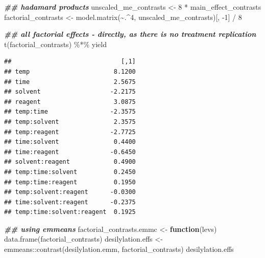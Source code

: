 \documentclass[
]{book}
\newenvironment{Shaded}{\begin{snugshade}}{\end{snugshade}}
\newcommand{\ControlFlowTok}[1]{\textcolor[rgb]{0.13,0.29,0.53}{\textbf{#1}}}
\newcommand{\DecValTok}[1]{\textcolor[rgb]{0.00,0.00,0.81}{#1}}
\newcommand{\DocumentationTok}[1]{\textcolor[rgb]{0.56,0.35,0.01}{\textbf{\textit{#1}}}}
\newcommand{\FunctionTok}[1]{\textcolor[rgb]{0.00,0.00,0.00}{#1}}
\newcommand{\NormalTok}[1]{#1}
\newcommand{\OtherTok}[1]{\textcolor[rgb]{0.56,0.35,0.01}{#1}}
\newcommand{\SpecialCharTok}[1]{\textcolor[rgb]{0.00,0.00,0.00}{#1}}
\newcommand{\StringTok}[1]{\textcolor[rgb]{0.31,0.60,0.02}{#1}}
\theoremstyle{definition}
\theoremstyle{definition}
\theoremstyle{definition}
\theoremstyle{definition}
\theoremstyle{remark}
\begin{document}
\begin{Shaded}
\begin{Highlighting}[]
\DocumentationTok{\#\# hadamard products}
\NormalTok{unscaled\_me\_contrasts }\OtherTok{\textless{}{-}} \DecValTok{8} \SpecialCharTok{*}\NormalTok{ main\_effect\_contrasts}
\NormalTok{factorial\_contrasts }\OtherTok{\textless{}{-}} \FunctionTok{model.matrix}\NormalTok{(}\SpecialCharTok{\textasciitilde{}}\NormalTok{.}\SpecialCharTok{\^{}}\DecValTok{4}\NormalTok{, unscaled\_me\_contrasts)[, }\SpecialCharTok{{-}}\DecValTok{1}\NormalTok{] }\SpecialCharTok{/} \DecValTok{8}

\DocumentationTok{\#\# all factorial effects {-} directly, as there is no treatment replication}
\FunctionTok{t}\NormalTok{(factorial\_contrasts) }\SpecialCharTok{\%*\%}\NormalTok{ yield}
\end{Highlighting}
\end{Shaded}

\begin{verbatim}
##                              [,1]
## temp                       8.1200
## time                       2.5675
## solvent                   -2.2175
## reagent                    3.0875
## temp:time                 -2.3575
## temp:solvent               2.3575
## temp:reagent              -2.7725
## time:solvent               0.4400
## time:reagent              -0.6450
## solvent:reagent            0.4900
## temp:time:solvent          0.2450
## temp:time:reagent          0.1950
## temp:solvent:reagent      -0.0300
## time:solvent:reagent      -0.2375
## temp:time:solvent:reagent  0.1925
\end{verbatim}

\begin{Shaded}
\begin{Highlighting}[]
\DocumentationTok{\#\# using emmeans}
\NormalTok{factorial\_contrasts.emmc }\OtherTok{\textless{}{-}} \ControlFlowTok{function}\NormalTok{(levs) }\FunctionTok{data.frame}\NormalTok{(factorial\_contrasts)}
\NormalTok{desilylation.effs }\OtherTok{\textless{}{-}}\NormalTok{ emmeans}\SpecialCharTok{::}\FunctionTok{contrast}\NormalTok{(desilylation.emm, }\StringTok{\textquotesingle{}factorial\_contrasts\textquotesingle{}}\NormalTok{)}
\NormalTok{desilylation.effs}
\end{Highlighting}
\end{Shaded}
\end{document}
